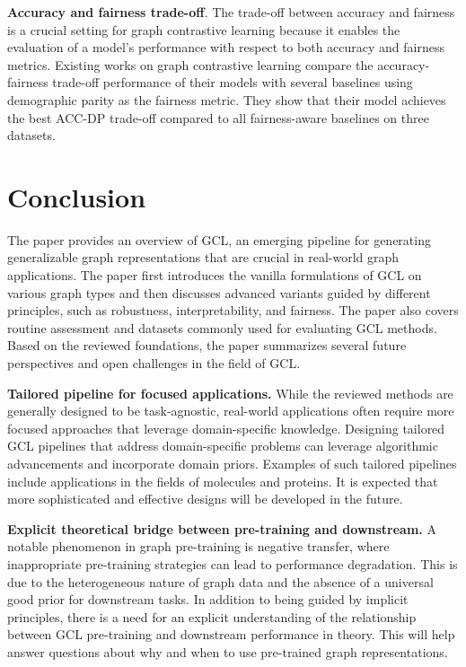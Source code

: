 \documentclass[11pt]{article}
\begin{document}
\textbf{Accuracy and fairness trade-off}. The trade-off between accuracy and fairness is a crucial setting for graph contrastive learning because it enables the evaluation of a model's performance with respect to both accuracy and fairness metrics. Existing works on graph contrastive learning compare the accuracy-fairness trade-off performance of their models with several baselines using demographic parity as the fairness metric. They show that their model achieves the best ACC-DP trade-off compared to all fairness-aware baselines on three datasets.


\section{Conclusion}
The paper provides an overview of GCL, an emerging pipeline for generating generalizable graph representations that are crucial in real-world graph applications. The paper first introduces the vanilla formulations of GCL on various graph types and then discusses advanced variants guided by different principles, such as robustness, interpretability, and fairness. The paper also covers routine assessment and datasets commonly used for evaluating GCL methods. Based on the reviewed foundations, the paper summarizes several future perspectives and open challenges in the field of GCL.

\textbf{Tailored pipeline for focused applications.}
While the reviewed methods are generally designed to be task-agnostic, real-world applications often require more focused approaches that leverage domain-specific knowledge. Designing tailored GCL pipelines that address domain-specific problems can leverage algorithmic advancements and incorporate domain priors. Examples of such tailored pipelines include applications in the fields of molecules and proteins. It is expected that more sophisticated and effective designs will be developed in the future.

\textbf{Explicit theoretical bridge between pre-training and downstream.}
A notable phenomenon in graph pre-training is negative transfer, where inappropriate pre-training strategies can lead to performance degradation. This is due to the heterogeneous nature of graph data and the absence of a universal good prior for downstream tasks. In addition to being guided by implicit principles, there is a need for an explicit understanding of the relationship between GCL pre-training and downstream performance in theory. This will help answer questions about why and when to use pre-trained graph representations.
\end{document}
